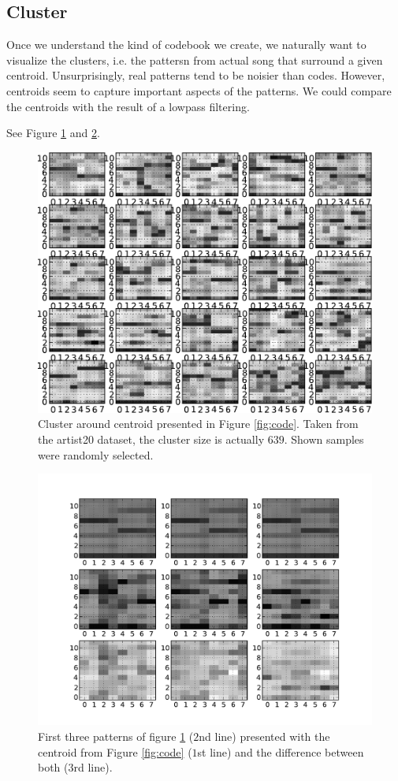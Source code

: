 \documentclass{article}
\begin{document}
\subsection{Cluster}
Once we understand the kind of codebook we create, we naturally want
to visualize the clusters, i.e. the pattersn from actual song that
surround a given centroid. Unsurprisingly, real patterns tend to be
noisier than codes. However, centroids seem to capture important aspects
of the patterns. We could compare the centroids with the result of
a lowpass filtering.

See Figure \ref{fig:cluster} and \ref{fig:cluster_diff}.

\begin{figure}[htb]
\begin{center}
\includegraphics[width=.9\columnwidth]{close_patterns1}
\end{center}
\caption{\small{Cluster around centroid presented in
Figure \ref{fig:code}. Taken from the artist20 dataset, the cluster
size is actually $639$. Shown samples were randomly selected.
}}
\label{fig:cluster}
\end{figure}

\begin{figure}[htb]
\begin{center}
\includegraphics[width=.8\columnwidth]{close_patterns_diff}
\end{center}
\caption{\small{First three patterns of figure \ref{fig:cluster}
($2$nd line) presented with the centroid from Figure \ref{fig:code}
($1$st line) and the difference between both ($3$rd line).
}}
\label{fig:cluster_diff}
\end{figure}
\end{document}
